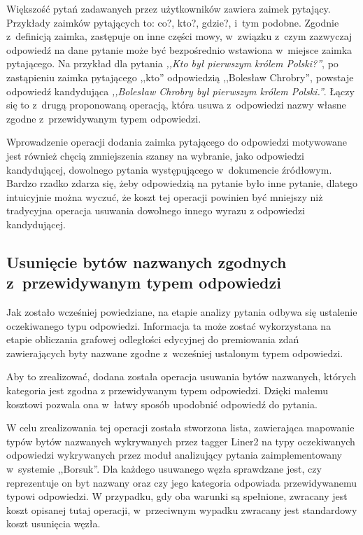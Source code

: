 \documentclass[a4paper, twoside, 12pt]{report}
\begin{document}
            Większość pytań zadawanych przez użytkowników zawiera zaimek pytający. Przykłady zaimków pytających to: co?,
            kto?, gdzie?, i~tym podobne. Zgodnie z~definicją zaimka, zastępuje on inne części mowy, w~związku z~czym
            zazwyczaj odpowiedź na dane pytanie może być bezpośrednio wstawiona w~miejsce
            zaimka pytającego. Na przykład dla pytania \emph{,,Kto był pierwszym królem Polski?''}, po zastąpieniu zaimka
            pytającego ,,kto'' odpowiedzią ,,Bolesław Chrobry'', powstaje odpowiedź kandydująca
            \emph{,,Bolesław Chrobry był pierwszym królem Polski.''}. Łączy się to z~drugą proponowaną operacją, która
            usuwa z~odpowiedzi nazwy własne zgodne z~przewidywanym typem odpowiedzi.

            Wprowadzenie operacji dodania zaimka pytającego do odpowiedzi motywowane jest również chęcią zmniejszenia
            szansy na wybranie, jako odpowiedzi kandydującej, dowolnego pytania występującego w~dokumencie źródłowym.
            Bardzo rzadko zdarza się, żeby odpowiedzią na pytanie było inne pytanie, dlatego intuicyjnie można wyczuć,
            że koszt tej operacji powinien być mniejszy niż tradycyjna operacja usuwania dowolnego innego wyrazu z
            odpowiedzi kandydującej.

        \subsection{Usunięcie bytów nazwanych zgodnych z~przewidywanym typem odpowiedzi}
            Jak zostało wcześniej powiedziane, na etapie analizy pytania odbywa się ustalenie oczekiwanego typu odpowiedzi.
            Informacja ta może zostać wykorzystana na etapie obliczania grafowej odległości edycyjnej do premiowania
            zdań zawierających byty nazwane zgodne z~wcześniej ustalonym typem odpowiedzi.

            Aby to zrealizować, dodana została operacja usuwania bytów nazwanych, których kategoria jest zgodna z
            przewidywanym typem odpowiedzi. Dzięki małemu kosztowi pozwala ona w~łatwy sposób upodobnić odpowiedź
            do pytania.

            W celu zrealizowania tej operacji została stworzona lista, zawierająca mapowanie typów bytów nazwanych
            wykrywanych przez tagger Liner2\cite{LINER2} na typy oczekiwanych odpowiedzi wykrywanych przez moduł analizujący pytania
            zaimplementowany w~systemie ,,Borsuk''. Dla każdego usuwanego węzła sprawdzane jest, czy reprezentuje on
            byt nazwany oraz czy jego kategoria odpowiada przewidywanemu typowi odpowiedzi. W przypadku, gdy oba warunki
            są spełnione, zwracany jest koszt opisanej tutaj operacji, w~przeciwnym wypadku zwracany jest standardowy koszt
            usunięcia węzła.
\end{document}
